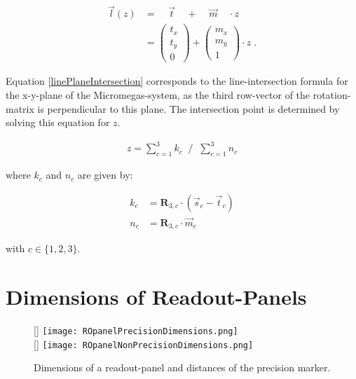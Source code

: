 \documentclass[
twoside,            %
BCOR1.4cm,          %
10pt,               %
headings=normal,    %
headsepline,        %
clearplainpage,		%
final,              %
div=14,
open=right,
bibliography=toc
]{scrreprt}
\begin{document}
\begin{align}
	\vec{l}(z) &= \;\;\;\; \vec{t} \;\;\;\; + \;\;\;\; \vec{m} \;\;\;\; \cdot z
	\nonumber
	\\
	&=
		\begin{pmatrix}
			t_x \\ t_y \\ 0
		\end{pmatrix}
		+ 
		\begin{pmatrix}
			m_x \\ m_y \\ 1
		\end{pmatrix} \cdot z \; .
\end{align}

Equation \ref{linePlaneIntersection} corresponds to the line-intersection formula for the x-y-plane of the Micromegas-system, as the third row-vector of the rotation-matrix is perpendicular to this plane.
The intersection point is determined by solving this equation for $z$.

\begin{align}
	z = \sum_{c = 1}^{3} k_c \;\; \bigg/ \;\; \sum_{c = 1}^{3} n_c
\end{align}

where $k_c$ and $n_c$ are given by:

\begin{align*}
	k_c &= \boldsymbol{R}_{3,c} \cdot ( \vec{s}_c - \vec{t}_c )
	\\
	n_c &= \boldsymbol{R}_{3,c} \cdot \vec{m}_c
\end{align*}

with $c \in \{1,2,3\}$.

\chapter{Dimensions of Readout-Panels}\label{roPanelDimensions}

\begin{figure}[!h]
	\centering
	[\textwidth]
	{\texttt{[image: ROpanelPrecisionDimensions.png]}}
	\\
	[\textwidth]
	{\texttt{[image: ROpanelNonPrecisionDimensions.png]}}
	\vspace{-2mm}
	\caption{
		Dimensions of a readout-panel and distances of the precision marker.
	}
	\label{ROpanelDimensions}
\end{figure}
\end{document}
